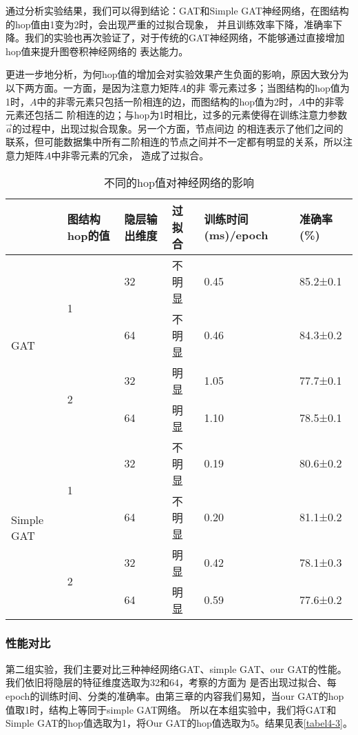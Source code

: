 通过分析实验结果，我们可以得到结论：GAT和Simple GAT神经网络，在图结构的hop值由1变为2时，会出现严重的过拟合现象，
并且训练效率下降，准确率下降。我们的实验也再次验证了，对于传统的GAT神经网络，不能够通过直接增加hop值来提升图卷积神经网络的
表达能力。

更进一步地分析，为何hop值的增加会对实验效果产生负面的影响，原因大致分为以下两方面。一方面，是因为注意力矩阵$A$的非
零元素过多；当图结构的hop值为1时，$A$中的非零元素只包括一阶相连的边，而图结构的hop值为2时，$A$中的非零元素还包括二
阶相连的边；与hop为1时相比，过多的元素使得在训练注意力参数$ \vec{a} $的过程中，出现过拟合现象。另一个方面，节点间边
的相连表示了他们之间的联系，但可能数据集中所有二阶相连的节点之间并不一定都有明显的关系，所以注意力矩阵$A$中非零元素的冗余，
造成了过拟合。

\begin{table}[]
    \centering
    \caption{不同的hop值对神经网络的影响}
    \label{tabel4-2}
    \begin{tabular}{|l|l|l|l|l|l|}
    \hline
                         & 图结构hop的值           & 隐层输出维度 & 过拟合 & 训练时间(ms)/epoch & 准确率(\%)      \\ \hline
    \multirow{4}{*}{GAT} & \multirow{2}{*}{1} & 32     & 不明显 & 0.45            & 85.2±0.1 \\ \cline{3-6}
                         &                    & 64     & 不明显 & 0.46            & 84.3±0.2 \\ \cline{2-6}
                         & \multirow{2}{*}{2} & 32     & 明显   & 1.05            & 77.7±0.1 \\ \cline{3-6}
                         &                    & 64     & 明显   & 1.10            & 78.5±0.1 \\ \hline
    \multirow{4}{*}{Simple GAT} & \multirow{2}{*}{1} & 32     & 不明显 & 0.19     & 80.6±0.2 \\ \cline{3-6}
                         &                    & 64     & 不明显 & 0.20            & 81.1±0.2 \\ \cline{2-6}
                         & \multirow{2}{*}{2} & 32     & 明显   & 0.42            & 78.1±0.3 \\ \cline{3-6}
                         &                    & 64     & 明显   & 0.59            & 77.6±0.2 \\ \hline                    
    \end{tabular}
\end{table}

\subsubsection{性能对比}
第二组实验，我们主要对比三种神经网络GAT、simple GAT、our GAT的性能。我们依旧将隐层的特征维度选取为32和64，考察的方面为
是否出现过拟合、每epoch的训练时间、分类的准确率。由第三章的内容我们易知，当our GAT的hop值取1时，结构上等同于simple GAT网络。
所以在本组实验中，我们将GAT和Simple GAT的hop值选取为1，将Our GAT的hop值选取为5。结果见表\ref{tabel4-3}。


